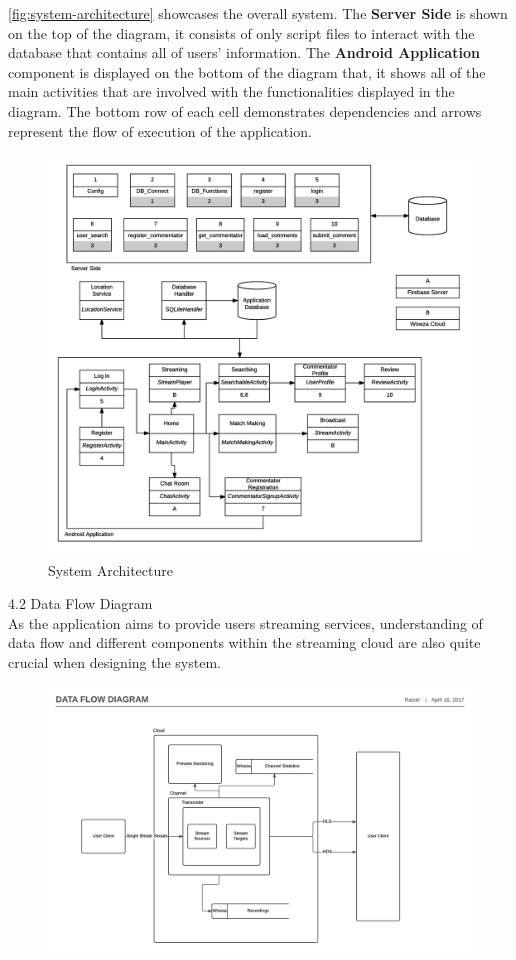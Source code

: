\documentclass{article}
\begin{document}
\begin{flushleft}
\autoref{fig:system-architecture} showcases the overall system. The \textbf{Server Side} is shown on the top of the diagram, it consists of only script files to interact with the database that contains all of users' information. The \textbf{Android Application} component is displayed on the bottom of the diagram that, it shows all of the main activities that are involved with the functionalities displayed in the diagram. The bottom row of each cell demonstrates dependencies and arrows represent the flow of execution of the application.\\
\begin{figure}[!h]
	\centering
	\includegraphics[width=13.5cm]{system-architecture}
	\caption{System Architecture}
	\label{fig:system-architecture}
\end{figure}
{\Large 4.2 Data Flow Diagram}\\
As the application aims to provide users streaming services, understanding of data flow and different components within the streaming cloud are also quite crucial when designing the system.\\
\begin{figure}[!h]
	\centering
	\includegraphics[width=14cm]{data-flow-diagram}

\end{figure}
\end{flushleft}
\end{document}
